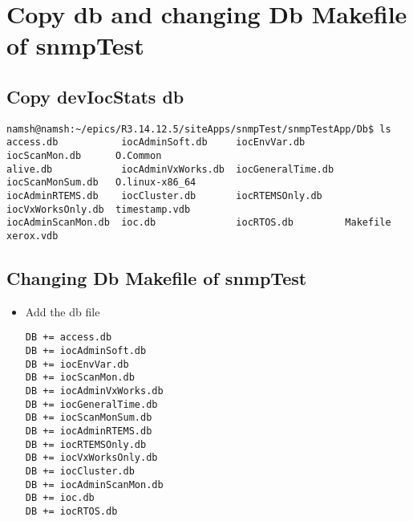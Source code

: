 \documentclass[11pt
  , a4paper
  , article
  , oneside
]{memoir}
\begin{document}
\section{Copy db and changing Db Makefile of snmpTest}
\subsection{Copy devIocStats db}
\begin{lstlisting}[style=termstyle]
namsh@namsh:~/epics/R3.14.12.5/siteApps/snmpTest/snmpTestApp/Db$ ls
access.db           iocAdminSoft.db     iocEnvVar.db       iocScanMon.db      O.Common
alive.db            iocAdminVxWorks.db  iocGeneralTime.db  iocScanMonSum.db   O.linux-x86_64
iocAdminRTEMS.db    iocCluster.db       iocRTEMSOnly.db    iocVxWorksOnly.db  timestamp.vdb
iocAdminScanMon.db  ioc.db              iocRTOS.db         Makefile           xerox.vdb
\end{lstlisting}
\subsection{Changing Db Makefile of snmpTest}
\begin{itemize}
	\item Add the db file
	\begin{lstlisting}[style=termstyle]
DB += access.db 
DB += iocAdminSoft.db
DB += iocEnvVar.db
DB += iocScanMon.db
DB += iocAdminVxWorks.db
DB += iocGeneralTime.db
DB += iocScanMonSum.db
DB += iocAdminRTEMS.db
DB += iocRTEMSOnly.db
DB += iocVxWorksOnly.db
DB += iocCluster.db
DB += iocAdminScanMon.db
DB += ioc.db
DB += iocRTOS.db 
\end{lstlisting}
\end{itemize}
\end{document}
